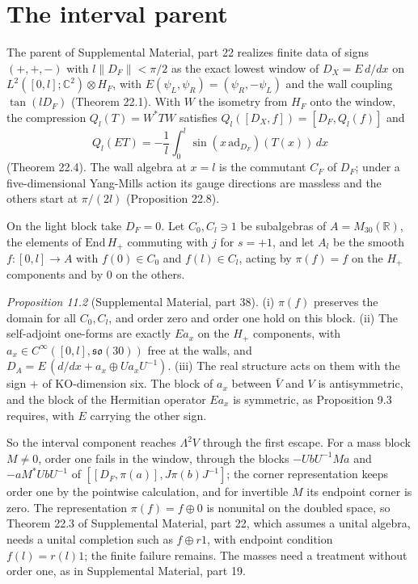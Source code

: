 \documentclass[aps,prd,reprint,onecolumn,nofootinbib,amsmath,amssymb,floatfix]{revtex4-2}
\theoremstyle{plain}
\newcommand{\C}{\mathbb C}
\newcommand{\supp}[1]{Supplemental Material, part #1}
\begin{document}
\section{The interval parent}\label{sec:interval}

The parent of \supp{22} realizes finite data of signs $(+,+,-)$ with $l\|D_F\|<\pi/2$ as the exact lowest window of $D_X=E\,d/dx$ on $L^2([0,l];\C^2)\otimes H_F$, with $E(\psi_L,\psi_R)=(\psi_R,-\psi_L)$ and the wall coupling $\tan(lD_F)$ (Theorem 22.1). With $W$ the isometry from $H_F$ onto the window, the compression $Q_l(T)=W^*TW$ satisfies $Q_l([D_X,f])=[D_F,Q_l(f)]$ and
\begin{equation}\label{eq:compression}
Q_l(ET)=-\frac1l\int_0^l\sin(x\,\mathrm{ad}_{D_F})(T(x))\,dx
\end{equation}
(Theorem 22.4). The wall algebra at $x=l$ is the commutant $C_F$ of $D_F$; under a five-dimensional Yang-Mills action its gauge directions are massless and the others start at $\pi/(2l)$ (Proposition 22.8).

On the light block take $D_F=0$. Let $C_0,C_l\ni1$ be subalgebras of $A=M_{30}(\mathbb R)$, the elements of $\mathrm{End}\,H_+$ commuting with $j$ for $s=+1$, and let $A_l$ be the smooth $f:[0,l]\to A$ with $f(0)\in C_0$ and $f(l)\in C_l$, acting by $\pi(f)=f$ on the $H_+$ components and by $0$ on the others.

\smallskip\noindent\textit{Proposition 11.2} (\supp{38}). (i) $\pi(f)$ preserves the domain for all $C_0,C_l$, and order zero and order one hold on this block. (ii) The self-adjoint one-forms are exactly $Ea_x$ on the $H_+$ components, with $a_x\in C^\infty([0,l],\mathfrak{so}(30))$ free at the walls, and $D_A=E\,(d/dx+a_x\oplus Ua_xU^{-1})$. (iii) The real structure acts on them with the sign $+$ of KO-dimension six. The block of $a_x$ between $\bar V$ and $V$ is antisymmetric, and the block of the Hermitian operator $Ea_x$ is symmetric, as Proposition 9.3 requires, with $E$ carrying the other sign.
\smallskip

So the interval component reaches $\Lambda^2V$ through the first escape. For a mass block $M\neq0$, order one fails in the window, through the blocks $-UbU^{-1}Ma$ and $-aM^*UbU^{-1}$ of $[[D_F,\pi(a)],J\pi(b)J^{-1}]$; the corner representation keeps order one by the pointwise calculation, and for invertible $M$ its endpoint corner is zero. The representation $\pi(f)=f\oplus0$ is nonunital on the doubled space, so Theorem 22.3 of \supp{22}, which assumes a unital algebra, needs a unital completion such as $f\oplus r1$, with endpoint condition $f(l)=r(l)1$; the finite failure remains. The masses need a treatment without order one, as in \supp{19}.
\end{document}
